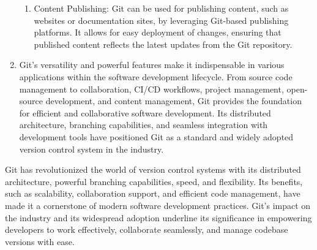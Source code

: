 \begin{enumerate}
\begin{enumerate}
        \item Content Publishing: Git can be used for publishing content, such as websites or documentation sites, by leveraging Git-based publishing platforms. It allows for easy deployment of changes, ensuring that published content reflects the latest updates from the Git repository.
    \end{enumerate}
    \item Git's versatility and powerful features make it indispensable in various applications within the software development lifecycle. From source code management to collaboration, CI/CD workflows, project management, open-source development, and content management, Git provides the foundation for efficient and collaborative software development. Its distributed architecture, branching capabilities, and seamless integration with development tools have positioned Git as a standard and widely adopted version control system in the industry.
\end{enumerate}


Git has revolutionized the world of version control systems with its distributed architecture, powerful branching capabilities, speed, and flexibility. Its benefits, such as scalability, collaboration support, and efficient code management, have made it a cornerstone of modern software development practices. Git's impact on the industry and its widespread adoption underline its significance in empowering developers to work effectively, collaborate seamlessly, and manage codebase versions with ease.